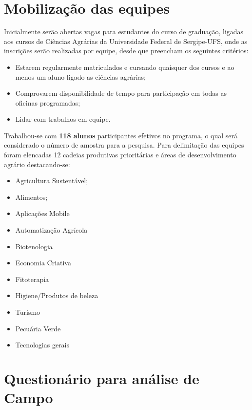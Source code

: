 \section{Mobilização das equipes}

Inicialmente serão abertas vagas para estudantes do curso de graduação, ligadas aos cursos de Ciências Agrárias da Universidade Federal de Sergipe-UFS, onde as inscrições serão realizadas por equipe, desde que preencham os seguintes critérios:

	
\begin{itemize}
\item{Estarem regularmente matriculados e cursando quaisquer dos cursos e ao menos um aluno ligado as ciências agrárias;}
\item{Comprovarem disponibilidade de tempo para participação em todas as oficinas programadas;}
\item{Lidar com trabalhos em equipe.}
\end{itemize}

Trabalhou-se com \textbf{118 alunos} participantes efetivos no programa, o qual será considerado o número de amostra para a pesquisa. Para delimitação das equipes foram elencadas 12 cadeias produtivas  prioritárias e áreas de desenvolvimento agrário destacando-se:

\begin{multicols}{2}
\centering
    \begin{itemize}
    \item{Agricultura Sustentável;}
    \item{Alimentos;}
    \item{Aplicações Mobile}
    \item{Automatização Agrícola}
    \item{Biotenologia}
    \item{Economia Criativa}
    \item{Fitoterapia}
    \item{Higiene/Produtos de beleza}
    \item{Turismo}
    \item{Pecuária Verde}
    \item{Tecnologias gerais}
\end{itemize}
\end{multicols}

\section{Questionário para análise de Campo}

